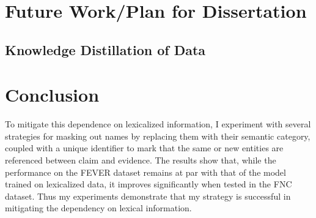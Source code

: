 \documentclass[compsoc,onecolumn]{IEEEtran}
\begin{document}
\section{Future Work/Plan for Dissertation}
\subsection{Knowledge Distillation of Data}

\section{Conclusion}
 To mitigate this dependence on lexicalized information, I experiment with several strategies for masking out names by replacing them with their semantic category, coupled with a unique identifier to mark that the same or new entities are referenced between claim and evidence. The results show that, while the performance on the FEVER dataset remains at par with that of the model trained on lexicalized data, it improves significantly when tested in the FNC dataset. Thus my experiments demonstrate that my strategy is successful in mitigating the dependency on lexical information.





\balance
\begin{spacing}{0.88}


\end{spacing}

\end{document}
